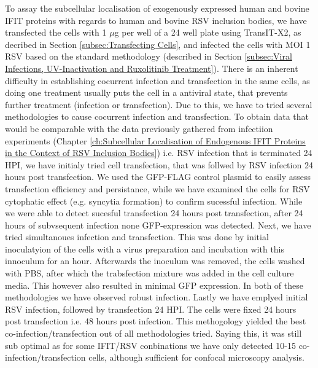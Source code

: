 To assay the subcellular localisation of exogenously expressed human and bovine IFIT proteins with regards to human and bovine RSV inclusion bodies, we have transfected the cells with 1 \(\mu\)g per well of a 24 well plate using TransIT-X2, as decribed in Section \ref{subsec:Transfecting Cells}, and infected the cells with MOI 1 RSV based on the standard methodology (described in Section \ref{subsec:Viral Infections, UV-Inactivation and Ruxolitinib Treatment}). There is an inherent difficulty in establishing cocurrent infection and transfection in the same cells, as doing one treatment usually puts the cell in a antiviral state, that prevents further treatment (infection or transfection). Due to this, we have to tried several methodologies to cause cocurrent infection and transfection. To obtain data that would be comparable with the data previously gathered from infectiion experiments (Chapter \ref{ch:Subcellular Localisation of Endogenous IFIT Proteins in the Context of RSV Inclusion Bodies}) i.e. RSV infection that is terminated 24 HPI, we have initialy tried cell transfection, that was follwed by RSV infection 24 hours post transfection. We used the GFP-FLAG control plasmid to easily assess transfection efficiency and persistance, while we have examined the cells for RSV cytophatic effect (e.g. syncytia formation) to confirm sucessful infection. While we were able to detect sucesful transfection 24 hours post transfection, after 24 hours of subvsequent infection none GFP-expression was detected. Next, we have tried simultanoues infection and transfection. This was done by initial inoculatyion of the cells with a virus preparation and incubation with this innoculum for an hour. Afterwards the inoculum was removed, the cells washed with PBS, after which the trabsfection mixture was added in the cell culture media. This however also resulted in minimal GFP expression. In both of these methodologies we have observed robust infection. Lastly we have emplyed initial RSV infection, followed by transfection 24 HPI. The cells were fixed 24 hours post transfection i.e. 48 hours post infection. This methogology yielded the best co-infection/transfection out of all methodologies tried. Saying this, it was still sub optimal as for some IFIT/RSV conbinations we have only detected 10-15 co-infection/transfection cells, although sufficient for confocal microscopy analysis.

